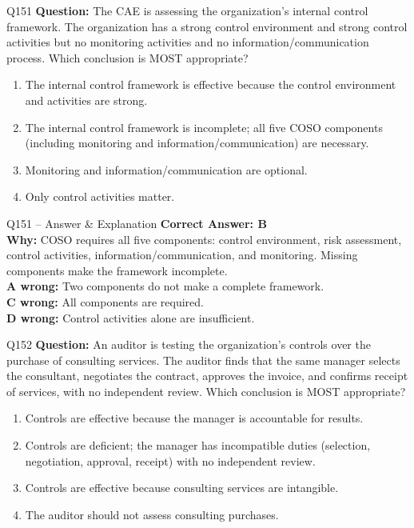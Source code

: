 \documentclass[aspectratio=169,10pt]{beamer}
\begin{document}
	\begin{frame}[t]{Q151}
		\small
		\textbf{Question:} The CAE is assessing the organization's internal control framework. The organization has a strong control environment and strong control activities but no monitoring activities and no information/communication process. Which conclusion is MOST appropriate?
		\begin{enumerate}[label=\Alph*.,itemsep=1pt,topsep=2pt]
			\item The internal control framework is effective because the control environment and activities are strong.
			\item The internal control framework is incomplete; all five COSO components (including monitoring and information/communication) are necessary.
			\item Monitoring and information/communication are optional.
			\item Only control activities matter.
		\end{enumerate}
	\end{frame}
	
	\begin{frame}[t]{Q151 -- Answer \& Explanation}
		\small
		\textbf{Correct Answer: B} \\[4pt]
		\textbf{Why:} COSO requires all five components: control environment, risk assessment, control activities, information/communication, and monitoring. Missing components make the framework incomplete. \\[4pt]
		\textbf{A wrong:} Two components do not make a complete framework. \\[2pt]
		\textbf{C wrong:} All components are required. \\[2pt]
		\textbf{D wrong:} Control activities alone are insufficient.
	\end{frame}
	
	\begin{frame}[t]{Q152}
		\small
		\textbf{Question:} An auditor is testing the organization's controls over the purchase of consulting services. The auditor finds that the same manager selects the consultant, negotiates the contract, approves the invoice, and confirms receipt of services, with no independent review. Which conclusion is MOST appropriate?
		\begin{enumerate}[label=\Alph*.,itemsep=1pt,topsep=2pt]
			\item Controls are effective because the manager is accountable for results.
			\item Controls are deficient; the manager has incompatible duties (selection, negotiation, approval, receipt) with no independent review.
			\item Controls are effective because consulting services are intangible.
			\item The auditor should not assess consulting purchases.
		\end{enumerate}
	\end{frame}
	
\end{document}
